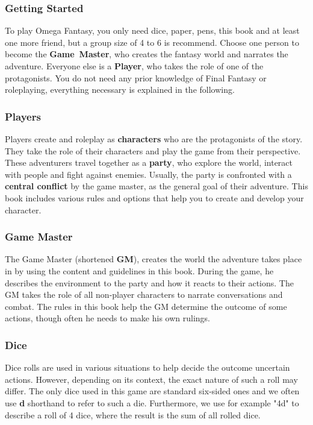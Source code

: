 \vfill

\subsubsection*{Getting Started}
To play Omega Fantasy, you only need dice, paper, pens, this book and at least one more friend, but a group size of 4 to 6 is recommend.
Choose one person to become the \mbox{\textbf{Game Master}}, who creates the fantasy world and narrates the adventure.
Everyone else is a \textbf{Player}, who takes the role of one of the protagonists.
You do not need any prior knowledge of Final Fantasy or roleplaying, everything necessary is explained in the following.

\pagebreak

\subsubsection*{Players}
Players create and roleplay as \textbf{characters} who are the protagonists of the story.
They take the role of their characters and play the game from their perspective.  
These adventurers travel together as a \textbf{party}, who explore the world, interact with people and fight against enemies. 
Usually, the party is confronted with a \textbf{central conflict} by the game master, as the general goal of their adventure.
This book includes various rules and options that help you to create and develop your character.  

\subsubsection*{Game Master}
The Game Master (shortened \textbf{GM}), creates the world the adventure takes place in by using the content and guidelines in this book. 
During the game, he describes the environment to the party and how it reacts to their actions. 
The GM takes the role of all non-player characters to narrate conversations and combat. 
The rules in this book help the GM determine the outcome of some actions, though often he needs to make his own rulings.

\subsubsection*{Dice}
Dice rolls are used in various situations to help decide the outcome uncertain actions.
However, depending on its context, the exact nature of such a roll may differ. 
The only dice used in this game are standard six-sided ones and we often use \textbf{d} shorthand to refer to such a die.
Furthermore, we use for example "4d" to describe a roll of 4 dice, where the result is the sum of all rolled dice.

